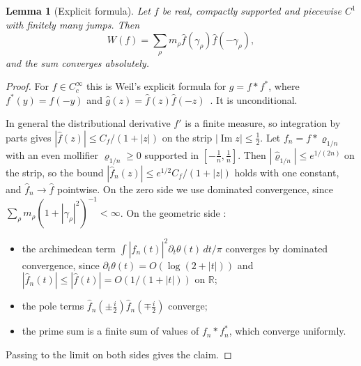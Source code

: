 \documentclass[11pt]{amsart}
\newtheorem{lemma}[proposition]{Lemma}
\theoremstyle{definition}
\theoremstyle{remark}
\numberwithin{equation}{section}
\newcommand{\R}{\mathbb{R}}
\begin{document}
\begin{lemma}[Explicit formula]\label{lem:EF}
Let $f$ be real, compactly supported and piecewise $C^1$ with finitely many jumps. Then
\[
W(f)=\sum_\rho m_\rho\hat f(\gamma_\rho)\hat f(-\gamma_\rho),
\]
and the sum converges absolutely.
\end{lemma}
\begin{proof}
For $f\in C_c^\infty$ this is Weil's explicit formula for $g=f*f^*$, where $f^*(y)=f(-y)$ and $\hat g(z)=\hat f(z)\hat f(-z)$~\cite{Weil52,Bombieri00}. It is unconditional.

In general the distributional derivative $f'$ is a finite measure, so integration by parts gives $|\hat f(z)|\le C_f/(1+|z|)$ on the strip $|\operatorname{Im}z|\le\frac12$. Let $f_n=f*\varrho_{1/n}$ with an even mollifier $\varrho_{1/n}\ge0$ supported in $[-\frac1n,\frac1n]$. Then $|\hat\varrho_{1/n}|\le e^{1/(2n)}$ on the strip, so the bound $|\hat f_n(z)|\le e^{1/2}C_f/(1+|z|)$ holds with one constant, and $\hat f_n\to\hat f$ pointwise. On the zero side we use dominated convergence, since $\sum_\rho m_\rho(1+|\gamma_\rho|^2)^{-1}<\infty$. On the geometric side \cite[(3.19)]{CCM25}:
\begin{itemize}
\item the archimedean term $\int|\hat f_n(t)|^2\partial_t\theta(t)\,dt/\pi$ converges by dominated convergence, since $\partial_t\theta(t)=O(\log(2+|t|))$ \cite[(3.24)]{CCM25} and $|\hat f_n(t)|\le|\hat f(t)|=O(1/(1+|t|))$ on $\R$;
\item the pole terms $\hat f_n(\pm\frac i2)\hat f_n(\mp\frac i2)$ converge;
\item the prime sum is a finite sum of values of $f_n*f_n^*$, which converge uniformly.
\end{itemize}
Passing to the limit on both sides gives the claim.
\end{proof}
\end{document}
